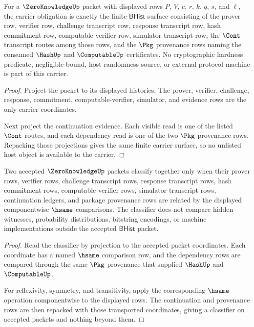 \begin{theorem}
\label{thm:zeroknowledge-carrier-obligation}
For a $\ZeroKnowledgeUp$ packet with displayed rows $P$, $V$, $c$, $r$, $k$, $q$, $s$, and $\ell$, the carrier obligation is exactly the finite $\mathsf{BHist}$ surface consisting of the prover row, verifier row, challenge transcript row, response transcript row, hash commitment row, computable verifier row, simulator transcript row, the $\Cont$ transcript routes among those rows, and the $\Pkg$ provenance rows naming the consumed $\HashUp$ and $\ComputableUp$ certificates. No cryptographic hardness predicate, negligible bound, host randomness source, or external protocol machine is part of this carrier.
\end{theorem}
\begin{proof}
Project the packet to its displayed histories. The prover, verifier, challenge, response, commitment, computable-verifier, simulator, and evidence rows are the only carrier coordinates.

Next project the continuation evidence. Each visible read is one of the listed $\Cont$ routes, and each dependency read is one of the two $\Pkg$ provenance rows. Repacking those projections gives the same finite carrier surface, so no unlisted host object is available to the carrier.
\end{proof}

\begin{theorem}
\label{thm:zeroknowledge-classifier-obligation}
Two accepted $\ZeroKnowledgeUp$ packets classify together only when their prover rows, verifier rows, challenge transcript rows, response transcript rows, hash commitment rows, computable verifier rows, simulator transcript rows, continuation ledgers, and package provenance rows are related by the displayed componentwise $\hsame$ comparisons. The classifier does not compare hidden witnesses, probability distributions, bitstring encodings, or machine implementations outside the accepted $\mathsf{BHist}$ packet.
\end{theorem}
\begin{proof}
Read the classifier by projection to the accepted packet coordinates. Each coordinate has a named $\hsame$ comparison row, and the dependency rows are compared through the same $\Pkg$ provenance that supplied $\HashUp$ and $\ComputableUp$.

For reflexivity, symmetry, and transitivity, apply the corresponding $\hsame$ operation componentwise to the displayed rows. The continuation and provenance rows are then repacked with those transported coordinates, giving a classifier on accepted packets and nothing beyond them.
\end{proof}

